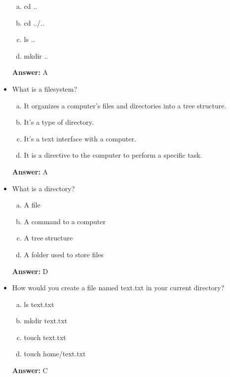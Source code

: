 \documentclass[12pt]{article}
\begin{document}
\begin{itemize}
    \begin{enumerate}[a)]
        \item cd ..
        \item cd ../..
        \item ls ..
        \item mkdir ..
    \end{enumerate}

    \bigskip

    \textbf{Answer:} A

    \item What is a filesystem?
    \begin{enumerate}[a)]
        \item It organizes a computer’s files and directories into a tree structure.
        \item It’s a type of directory.
        \item It’s a text interface with a computer.
        \item It is a directive to the computer to perform a specific task.
    \end{enumerate}

    \bigskip

    \textbf{Answer:} A

    \item What is a directory?
    \begin{enumerate}[a)]
        \item A file
        \item A command to a computer
        \item A tree structure
        \item A folder used to store files
    \end{enumerate}

    \bigskip

    \textbf{Answer:} D

    \item How would you create a file named text.txt in your current directory?
    \begin{enumerate}[a)]
        \item ls text.txt
        \item mkdir text.txt
        \item touch text.txt
        \item touch home/text.txt
    \end{enumerate}

    \bigskip

    \textbf{Answer:} C
\end{itemize}
\end{document}
